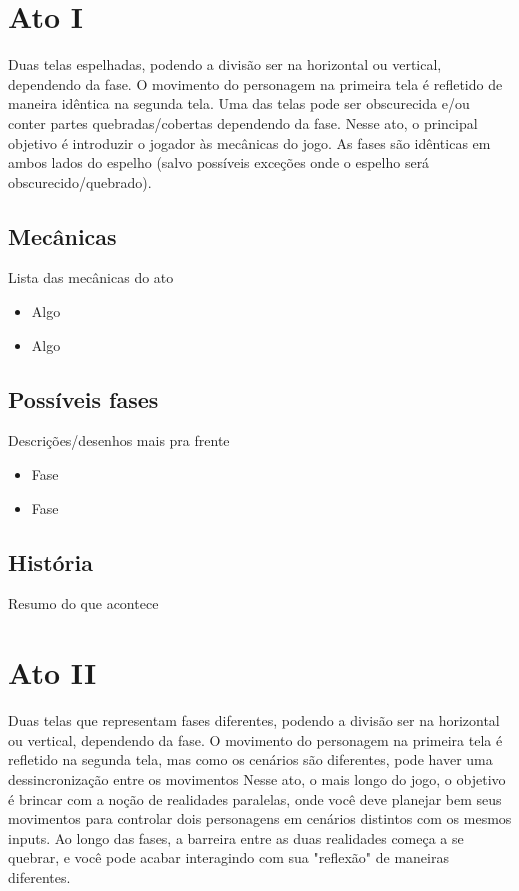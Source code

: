 \documentclass[a4paper, 11pt]{article}
\begin{document}
\section{Ato I}

	Duas telas espelhadas, podendo a divisão ser na horizontal ou vertical, dependendo da fase. O movimento do
	personagem na primeira tela é refletido de maneira idêntica na segunda tela. Uma das telas pode ser obscurecida
	e/ou conter partes quebradas/cobertas dependendo da fase.
	Nesse ato, o principal objetivo é introduzir o jogador às mecânicas do jogo. As fases são idênticas
	em ambos lados do espelho (salvo possíveis exceções onde o espelho será obscurecido/quebrado).

\subsection{Mecânicas}

	Lista das mecânicas do ato
	\begin{itemize}
		\item Algo
		\item Algo
	\end{itemize}

\subsection{Possíveis fases}

	Descrições/desenhos mais pra frente
	\begin{itemize}
		\item Fase
		\item Fase
	\end{itemize}

\subsection{História}

	Resumo do que acontece 

\section{Ato II}

	Duas telas que representam fases diferentes, podendo a divisão ser na horizontal ou vertical, dependendo da fase.
	O movimento do personagem na primeira tela é refletido na segunda tela, mas como os cenários são diferentes, pode
	haver uma dessincronização entre os movimentos
	Nesse ato, o mais longo do jogo, o objetivo é brincar com a noção de realidades paralelas, onde você deve planejar
	bem seus movimentos para controlar dois personagens em cenários distintos com os mesmos inputs. Ao longo das fases,
	a barreira entre as duas realidades começa a se quebrar, e você pode acabar interagindo com sua "reflexão" de 
	maneiras diferentes.
\end{document}
